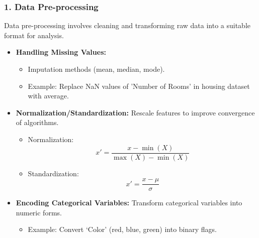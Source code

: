\documentclass[aspectratio=169]{beamer}
\begin{document}
\begin{frame}[fragile]
    \frametitle{1. Data Pre-processing}
    Data pre-processing involves cleaning and transforming raw data into a suitable format for analysis.

    \begin{itemize}
        \item \textbf{Handling Missing Values:} 
        \begin{itemize}
            \item Imputation methods (mean, median, mode).
            \item Example: Replace NaN values of 'Number of Rooms' in housing dataset with average.
        \end{itemize}
        
        \item \textbf{Normalization/Standardization:} Rescale features to improve convergence of algorithms.
        \begin{itemize}
            \item Normalization: 
            \begin{equation}
                x' = \frac{x - \min(X)}{\max(X) - \min(X)}
            \end{equation}
            \item Standardization: 
            \begin{equation}
                x' = \frac{x - \mu}{\sigma}
            \end{equation}
        \end{itemize}

        \item \textbf{Encoding Categorical Variables:} Transform categorical variables into numeric forms.
        \begin{itemize}
            \item Example: Convert ‘Color’ (red, blue, green) into binary flags.
        \end{itemize}
    \end{itemize}
\end{frame}
\end{document}
